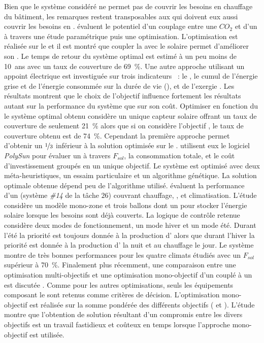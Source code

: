 Bien que le système considéré ne permet pas de couvrir les besoins en chauffage du
bâtiment, les remarques restent transposables aux  qui doivent eux aussi
couvrir les besoins en .
\textcite{Deng2013212} évaluent le potentiel d’un couplage entre une  $CO_{2}$ et
d’un  à travers une étude paramétrique puis une optimisation. L’optimisation est
réalisée sur le  et il est montré que coupler la  avec le
solaire permet d’améliorer son . Le temps de retour du système optimal est estimé
à un peu moins de \SI{10}{ans} avec un taux de couverture de \SI{69}{\percent}. Une autre
approche utilisant un appoint électrique est investiguée sur trois indicateurs
\parencite{Hin2012,Hin2014102}~:
le , le cumul de l’énergie grise et de l’énergie consommée sur la durée de vie
(), et de l’exergie . Les résultats montrent que le choix de l’objectif
influence fortement les résultats autant sur la performance du système que sur son coût.
Optimiser en fonction du  le système optimal obtenu considère un unique capteur
solaire offrant un taux de couverture de seulement \SI{21}{\percent} alors que si on
considère l’objectif , le taux de couverture obtenu est de \SI{74}{\percent}.
Cependant la première approche permet d’obtenir un  $\nicefrac{1}{3}$ inférieur à
la solution optimisée sur le . \textcite{Bornatico201231} utilisent eux le
logiciel \textit{PolySun} pour évaluer un  à travers $F_{sol}$, la
consommation totale, et le coût d’investissement groupés en un unique objectif. Le
système est optimisé avec deux méta-heuristiques, un essaim particulaire et un algorithme
génétique. La solution optimale obtenue dépend peu de l’algorithme utilisé.
\textcite{Asaee2014510} évaluent la performance d’un  (système \emph{\#14} de la tâche
$26$) couvrant chauffage, , et climatisation. L’étude considère un modèle
mono-zone et trois ballons dont un pour stocker l’énergie solaire lorsque les besoins sont déjà
couverts. La logique de contrôle retenue considère deux modes de fonctionnement, un mode
hiver et un mode été. Durant l’été la priorité est toujours donnée à la production
d’ alors que durant l’hiver la priorité est donnée à la production d’ la
nuit et au chauffage le jour. Le système montre de très bonnes performances pour les
quatre climats étudiés avec un $F_{sol}$ supérieur à \SI{70}{\percent}. Finalement
plus récemment, une comparaison entre une optimisation multi-objectifs et une optimisation
mono-objectif d’un  couplé à un  est discutée
\parencite{Rey2016622}. Comme pour les autres optimisations, seuls les équipements
composant le  sont retenus comme critères de décision. L’optimisation
mono-objectif est réalisée sur la somme pondérée des différents objectifs (
et ). L’étude montre que l’obtention de solution résultant d’un compromis entre
les divers objectifs est un travail fastidieux et coûteux en temps lorsque l’approche
mono-objectif est utilisée.


